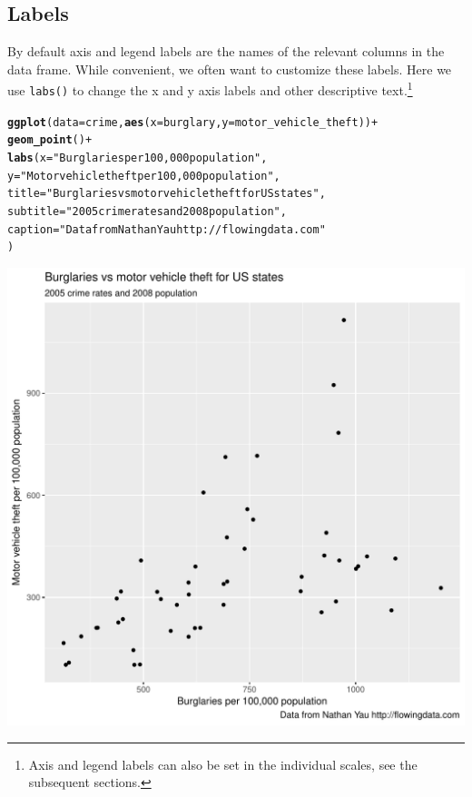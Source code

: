 \documentclass[12pt,oneside]{book}\usepackage[]{graphicx}\usepackage[]{color}
\makeatletter
\def\maxwidth{ %
  \ifdim\Gin@nat@width>\linewidth
    \linewidth
  \else
    \Gin@nat@width
  \fi
}
\newcommand{\hlstr}[1]{\textcolor[rgb]{0.192,0.494,0.8}{#1}}%
\newcommand{\hlopt}[1]{\textcolor[rgb]{0,0,0}{#1}}%
\newcommand{\hlstd}[1]{\textcolor[rgb]{0.345,0.345,0.345}{#1}}%
\newcommand{\hlkwc}[1]{\textcolor[rgb]{0.333,0.667,0.333}{#1}}%
\newcommand{\hlkwd}[1]{\textcolor[rgb]{0.737,0.353,0.396}{\textbf{#1}}}%
\newenvironment{kframe}{%
 \def\at@end@of@kframe{}%
 \ifinner\ifhmode%
  \def\at@end@of@kframe{\end{minipage}}%
  \begin{minipage}{\columnwidth}%
 \fi\fi%
 \def\FrameCommand##1{\hskip\@totalleftmargin \hskip-\fboxsep
 \colorbox{shadecolor}{##1}\hskip-\fboxsep
     \hskip-\linewidth \hskip-\@totalleftmargin \hskip\columnwidth}%
 \MakeFramed {\advance\hsize-\width
   \@totalleftmargin\z@ \linewidth\hsize
   \@setminipage}}%
 {\par\unskip\endMakeFramed%
 \at@end@of@kframe}
\newenvironment{knitrout}{}{} %
\makeatother
\begin{document}
\subsection{Labels}
By default axis and legend labels are the names of the relevant columns in the data frame. While convenient, we often want to customize these labels. Here we use \verb+labs()+ to change the x and y axis labels and other descriptive text.\footnote{Axis and legend labels can also be set in the individual scales, see the subsequent sections.}
\begin{knitrout}
\color{fgcolor}\begin{kframe}
\begin{alltt}
\hlkwd{ggplot}\hlstd{(}\hlkwc{data} \hlstd{= crime,} \hlkwd{aes}\hlstd{(}\hlkwc{x} \hlstd{= burglary,} \hlkwc{y} \hlstd{= motor_vehicle_theft))} \hlopt{+}
    \hlkwd{geom_point}\hlstd{()} \hlopt{+}
    \hlkwd{labs}\hlstd{(}\hlkwc{x} \hlstd{=} \hlstr{"Burglaries per 100,000 population"}\hlstd{,}
         \hlkwc{y} \hlstd{=} \hlstr{"Motor vehicle theft per 100,000 population"}\hlstd{,}
         \hlkwc{title} \hlstd{=} \hlstr{"Burglaries vs motor vehicle theft for US states"}\hlstd{,}
         \hlkwc{subtitle} \hlstd{=} \hlstr{"2005 crime rates and 2008 population"}\hlstd{,}
         \hlkwc{caption} \hlstd{=} \hlstr{"Data from Nathan Yau http://flowingdata.com"}
         \hlstd{)}
\end{alltt}
\end{kframe}
\includegraphics[width=\maxwidth]{figure/unnamed-chunk-71-1} 

\end{knitrout}
\end{document}
